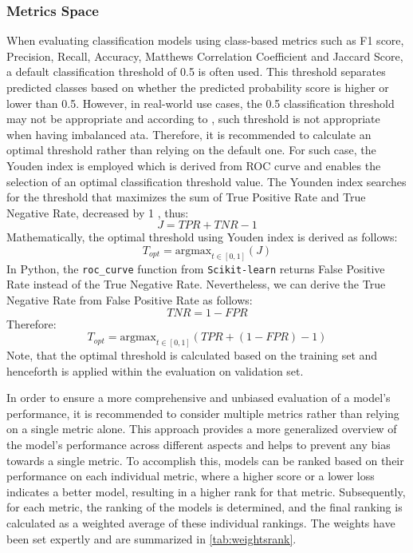 \subsubsection{Metrics Space}

When evaluating classification models using class-based metrics such as F1 score, Precision, Recall, Accuracy, Matthews Correlation Coefficient and Jaccard Score, a default classification threshold of 0.5 is often used. This threshold separates predicted classes based on whether the predicted probability score is higher or lower than 0.5.
However, in real-world use cases, the 0.5 classification threshold may not be appropriate and according to \citep{esposito2021ghost}, such threshold is not appropriate when having imbalanced ata. Therefore, it is recommended to calculate an optimal threshold rather than relying on the default one.
For such case, the Youden index is employed which is derived from ROC curve and enables the selection of an optimal classification threshold value. 
The Younden index searches for the threshold that maximizes the sum of True Positive Rate and True Negative Rate, decreased by 1 \citep{fluss2005estimation}, thus:
\begin{equation}\label{eq}
J = TPR + TNR - 1
\end{equation}
Mathematically, the optimal threshold using Youden index is derived as follows:
\begin{equation}\label{eq}
T_{opt} = \text{argmax}_{t \in [0, 1]}\left(J\right)
\end{equation}
In Python, the \lstinline{roc_curve} function from \lstinline{Scikit-learn} returns False Positive Rate instead of the True Negative Rate. Nevertheless, we can derive the True Negative Rate from False Positive Rate as follows:
\begin{equation}\label{eq}
TNR =  1-FPR
\end{equation}
Therefore:
\begin{equation}\label{eq}
T_{opt} = \text{argmax}_{t \in [0, 1]}\left(TPR +  \left(1-FPR\right) - 1\right)
\end{equation}
Note, that the optimal threshold is calculated based on the training set and henceforth is applied within the evaluation on validation set.

In order to ensure a more comprehensive and unbiased evaluation of a model's performance, it is recommended to consider multiple metrics rather than relying on a single metric alone. This approach provides a more generalized overview of the model's performance across different aspects and helps to prevent any bias towards a single metric.
To accomplish this, models can be ranked based on their performance on each individual metric, where a higher score or a lower loss indicates a better model, resulting in a higher rank for that metric. Subsequently, for each metric, the ranking of the models is determined, and the final ranking is calculated as a weighted average of these individual rankings.
The weights have been set expertly and are summarized in \autoref{tab:weightsrank}.

